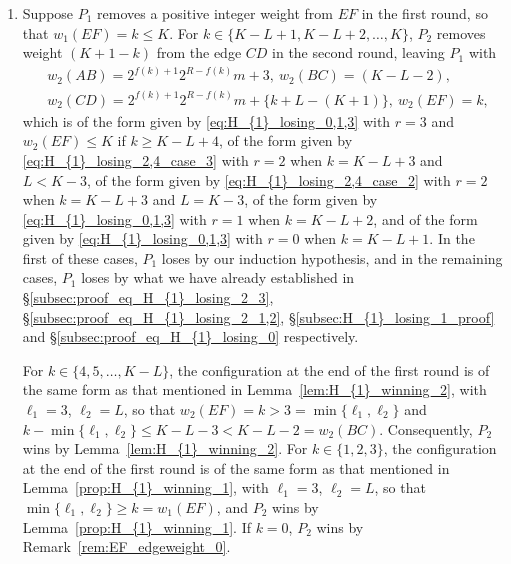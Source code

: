 \documentclass[11pt,reqno]{amsart}
\theoremstyle{definition}
\theoremstyle{definition}
\begin{document}
\begin{enumerate}
\begin{enumerate}
\item \label{recalled_later_1} Suppose $w_{1}(AB)=2^{R+1}m+\ell$ for some $\ell \in \{0,1,2\}$, and $w_{1}(BC)=0$. This leaves $P_{2}$ with a galaxy graph, consisting of the edges $AB$, $CD$ and $EF$, where $w_{1}(AB)=2^{R+1}m+\ell$, $w_{1}(CD)=2^{R+1}m+L$ and $w_{1}(EF)=(K+1)$. Since $L\leqslant (K-3)$ and $\ell\leqslant 2$, $P_{2}$ wins by Lemma~\ref{lem:H_{1}_winning_galaxy}.

\item If $w_{1}(AB)=2^{R+1}n+\ell_{1}$ for some $n < m$ and some $\ell_{1}\in\{0,1,\ldots,2^{R+1}-1\}$, the configuration after the first round is of the form given by Lemma~\ref{prop:H_{1}_winning_1} with $m_{1}=n$, $m_{2}=m$ and $\ell_{2}=L$. Since $n<m \implies m_{1}\neq m_{2}$, hence $P_{2}$ wins by Lemma~\ref{prop:H_{1}_winning_1}.
\end{enumerate}

\item Suppose $P_{1}$ removes a positive integer weight from $EF$ in the first round, so that $w_{1}(EF)=k\leqslant K$. For $k \in \{K-L+1,K-L+2,\ldots,K\}$, $P_{2}$ removes weight $(K+1-k)$ from the edge $CD$ in the second round, leaving $P_{1}$ with 
\begin{align}
{}&w_{2}(AB)=2^{f(k)+1}2^{R-f(k)}m+3,\ w_{2}(BC)=(K-L-2),\nonumber\\
{}&w_{2}(CD)=2^{f(k)+1}2^{R-f(k)}m+\{k+L-(K+1)\},\ w_{2}(EF)=k,\nonumber
\end{align}
which is of the form given by \eqref{eq:H_{1}_losing_0,1,3} with $r=3$ and $w_{2}(EF)\leqslant K$ if $k \geqslant K-L+4$, of the form given by \eqref{eq:H_{1}_losing_2,4_case_3} with $r=2$ when $k=K-L+3$ and $L<K-3$, of the form given by \eqref{eq:H_{1}_losing_2,4_case_2} with $r=2$ when $k=K-L+3$ and $L=K-3$, of the form given by \eqref{eq:H_{1}_losing_0,1,3} with $r=1$ when $k=K-L+2$, and of the form given by \eqref{eq:H_{1}_losing_0,1,3} with $r=0$ when $k=K-L+1$. In the first of these cases, $P_{1}$ loses by our induction hypothesis, and in the remaining cases, $P_{1}$ loses by what we have already established in \S\ref{subsec:proof_eq_H_{1}_losing_2_3}, \S\ref{subsec:proof_eq_H_{1}_losing_2_1,2}, \S\ref{subsec:H_{1}_losing_1_proof} and \S\ref{subsec:proof_eq_H_{1}_losing_0} respectively. 

For $k \in \{4,5,\ldots,K-L\}$, the configuration at the end of the first round is of the same form as that mentioned in Lemma~\ref{lem:H_{1}_winning_2}, with $\ell_{1}=3$, $\ell_{2}=L$, so that $w_{2}(EF)=k>3=\min\{\ell_{1},\ell_{2}\}$ and $k-\min\{\ell_{1},\ell_{2}\}\leqslant K-L-3 < K-L-2=w_{2}(BC)$. Consequently, $P_{2}$ wins by Lemma~\ref{lem:H_{1}_winning_2}. For $k\in\{1,2,3\}$, the configuration at the end of the first round is of the same form as that mentioned in Lemma~\ref{prop:H_{1}_winning_1}, with $\ell_{1}=3$, $\ell_{2}=L$, so that $\min\{\ell_{1},\ell_{2}\}\geqslant k=w_{1}(EF)$, and $P_{2}$ wins by Lemma~\ref{prop:H_{1}_winning_1}. If $k=0$, $P_{2}$ wins by Remark~\ref{rem:EF_edgeweight_0}.


\end{enumerate}
\end{document}

